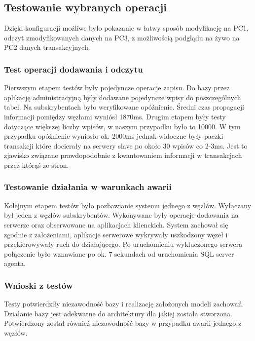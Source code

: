 \documentclass{article}
\begin{document}
\subsection{Testowanie wybranych operacji}	
Dzięki konfiguracji możliwe było pokazanie w łatwy sposób modyfikację na PC1, odczyt zmodyfikowanych danych na PC3, z możliwością podglądu na żywo na PC2 danych transakcyjnych.	

\subsubsection{Test operacji dodawania i odczytu}	

Pierwszym etapem testów były pojedyncze operacje zapisu. Do bazy przez aplikację administracyjną były dodawane pojedyncze wpisy do poszczególnych tabel. Na subskrybentach było weryfikowane opóźnienie. Średni czas propagacji informacji pomiędzy węzłami wyniósł 1870ms.
Drugim etapem były testy dotyczące większej liczby wpisów, w naszym przypadku było to 10000. W tym przypadku opóźnienie wyniosło ok. 2000ms jednak widoczne były paczki transakcji które docierały na serwery slave po około 30 wpisów co 2-3ms. Jest to zjawisko związane prawdopodobnie z kwantowaniem informacji w transakcjach przez którąś ze stron.

\subsubsection{Testowanie działania w warunkach awarii}
Kolejnym etapem testów było pozbawianie systemu jednego z węzłów. Wyłączany był jeden z węzłów subskrybentów. Wykonywane były operacje dodawania na serwerze oraz obserwowane na aplikacjach klienckich. System zachował się zgodnie z założeniami, aplikacje serwerowe wykrywały uszkodzony węzeł i przekierowywały ruch do działającego. Po uruchomieniu wykluczonego serwera połączenie było wznawiane po ok. 7 sekundach od uruchomienia SQL server agenta.

\subsubsection{Wnioski z testów}
Testy potwierdziły niezawodność bazy i realizację założonych modeli zachowań. Działanie bazy jest adekwatne do architektury dla jakiej została stworzona. Potwierdzony został również niezawodność bazy w przypadku awarii jednego z węzłów. 

\newpage
\end{document}

